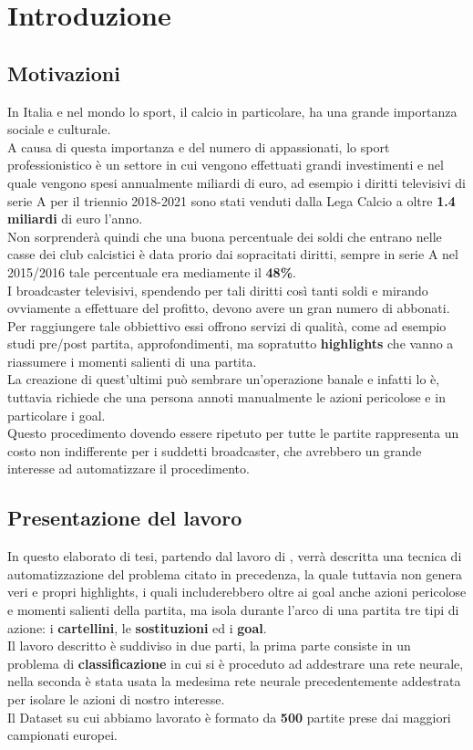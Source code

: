 \chapter{Introduzione}\label{ch:introduzione}
\section*{Motivazioni}
In Italia e nel mondo lo sport, il calcio in particolare, ha una grande importanza sociale e culturale.
\\A causa di questa importanza e del numero di appassionati, lo sport professionistico è un settore in cui vengono effettuati grandi investimenti e nel quale vengono spesi annualmente miliardi di euro, ad esempio i diritti televisivi di serie A per il triennio 2018-2021 sono stati venduti dalla Lega Calcio a oltre \textbf{1.4 miliardi} di euro l'anno. \cite{DirittiTriennio2018-21}
\\Non sorprenderà quindi che una buona percentuale dei soldi che entrano nelle casse dei club calcistici è data prorio dai sopracitati diritti, sempre in serie A nel 2015/2016 tale percentuale era mediamente il \textbf{48\%}. \cite{impattoDirittiTv}
\\I broadcaster televisivi, spendendo per tali diritti così tanti soldi e mirando ovviamente a effettuare del profitto, devono avere un gran numero di abbonati. Per raggiungere tale obbiettivo essi offrono servizi di qualità, come ad esempio studi pre/post partita, approfondimenti, ma sopratutto \textbf{highlights} che vanno a riassumere i momenti salienti di una partita. 
\\La creazione di quest'ultimi può sembrare un'operazione banale e infatti lo è, tuttavia richiede che una persona annoti manualmente le azioni pericolose e in particolare i goal.
\\Questo procedimento dovendo essere ripetuto per tutte le partite rappresenta un costo non indifferente per i suddetti broadcaster, che avrebbero un grande interesse ad automatizzare il procedimento.
\section*{Presentazione del lavoro}
In questo elaborato di tesi, partendo dal lavoro di \citet{soccerNet} , verrà descritta una tecnica di automatizzazione del problema citato in precedenza, la quale tuttavia non genera veri e propri highlights, i quali includerebbero oltre ai goal anche azioni pericolose e momenti salienti della partita, ma isola durante l'arco di una partita tre tipi di azione: i \textbf{cartellini}, le \textbf{sostituzioni} ed i \textbf{goal}.
\\Il lavoro descritto è suddiviso in due parti, la prima parte consiste in un problema di \textbf{classificazione} in cui si è proceduto ad addestrare una rete neurale, nella seconda è stata usata la medesima rete neurale precedentemente addestrata per isolare le azioni di nostro interesse.
\\Il Dataset su cui abbiamo lavorato è formato da \textbf{500} partite prese dai maggiori campionati europei.


